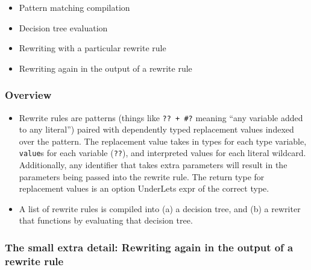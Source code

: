 \begin{itemize}
\tightlist
\item
  Pattern matching compilation
\item
  Decision tree evaluation
\item
  Rewriting with a particular rewrite rule
\item
  Rewriting again in the output of a rewrite rule
\end{itemize}

\hypertarget{overview}{%
\subsubsection{Overview}\label{overview}}

\begin{itemize}
\tightlist
\item
  Rewrite rules are patterns (things like \texttt{??\ +\ \#?} meaning
  ``any variable added to any literal'') paired with dependently typed
  replacement values indexed over the pattern. The replacement value
  takes in types for each type variable, \texttt{value}s for each
  variable (\texttt{??}), and interpreted values for each literal
  wildcard. Additionally, any identifier that takes extra parameters
  will result in the parameters being passed into the rewrite rule. The
  return type for replacement values is an option UnderLets expr of the
  correct type.
\item
  A list of rewrite rules is compiled into (a) a decision tree, and (b)
  a rewriter that functions by evaluating that decision tree.
\end{itemize}

\hypertarget{the-small-extra-detail-rewriting-again-in-the-output-of-a-rewrite-rule}{%
\subsubsection{The small extra detail: Rewriting again in the output of
a rewrite
rule}\label{the-small-extra-detail-rewriting-again-in-the-output-of-a-rewrite-rule}}

